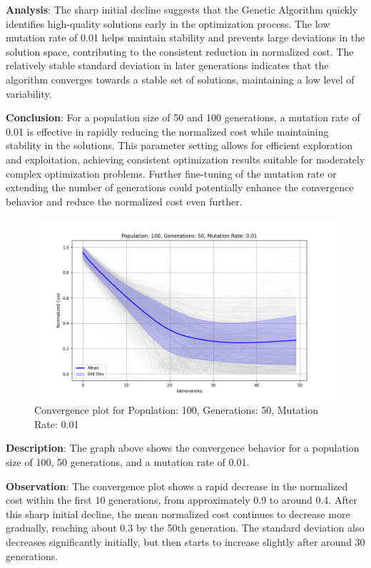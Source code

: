 \documentclass{article}
\begin{document}
    \textbf{Analysis}: The sharp initial decline suggests that the Genetic Algorithm quickly identifies high-quality solutions early in the optimization process. The low mutation rate of 0.01 helps maintain stability and prevents large deviations in the solution space, contributing to the consistent reduction in normalized cost. The relatively stable standard deviation in later generations indicates that the algorithm converges towards a stable set of solutions, maintaining a low level of variability.

    \textbf{Conclusion}: For a population size of 50 and 100 generations, a mutation rate of 0.01 is effective in rapidly reducing the normalized cost while maintaining stability in the solutions. This parameter setting allows for efficient exploration and exploitation, achieving consistent optimization results suitable for moderately complex optimization problems. Further fine-tuning of the mutation rate or extending the number of generations could potentially enhance the convergence behavior and reduce the normalized cost even further.

    \begin{figure}[H]
        \centering
        \includegraphics[width=\textwidth]{genetic_algorithm/Population_100_Generations_50_MutationRate_0.01}
        \caption{Convergence plot for Population: 100, Generations: 50, Mutation Rate: 0.01}
        \label{fig:ga_100_50_01}
    \end{figure}

    \textbf{Description}: The graph above shows the convergence behavior for a population size of 100, 50 generations, and a mutation rate of 0.01.

    \textbf{Observation}: The convergence plot shows a rapid decrease in the normalized cost within the first 10 generations, from approximately 0.9 to around 0.4. After this sharp initial decline, the mean normalized cost continues to decrease more gradually, reaching about 0.3 by the 50th generation. The standard deviation also decreases significantly initially, but then starts to increase slightly after around 30 generations.
\end{document}
